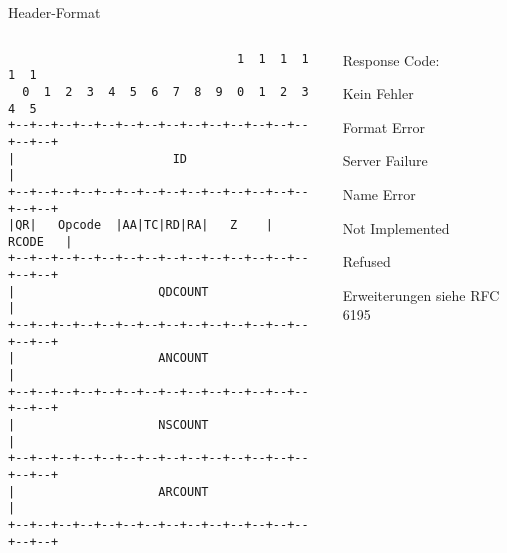 \documentclass{beamer}
\begin{document}
  \begin{frame}[fragile]{\mytitle}{Header-Format}
    \begin{columns}[c]
      \column{5cm}
      \tiny{
        \begin{verbatim}
                                1  1  1  1  1  1
  0  1  2  3  4  5  6  7  8  9  0  1  2  3  4  5
+--+--+--+--+--+--+--+--+--+--+--+--+--+--+--+--+
|                      ID                       |
+--+--+--+--+--+--+--+--+--+--+--+--+--+--+--+--+
|QR|   Opcode  |AA|TC|RD|RA|   Z    |   RCODE   |
+--+--+--+--+--+--+--+--+--+--+--+--+--+--+--+--+
|                    QDCOUNT                    |
+--+--+--+--+--+--+--+--+--+--+--+--+--+--+--+--+
|                    ANCOUNT                    |
+--+--+--+--+--+--+--+--+--+--+--+--+--+--+--+--+
|                    NSCOUNT                    |
+--+--+--+--+--+--+--+--+--+--+--+--+--+--+--+--+
|                    ARCOUNT                    |
+--+--+--+--+--+--+--+--+--+--+--+--+--+--+--+--+
        \end{verbatim}
      }
      \column{7cm}
      \footnotesize{
        \begin{description}
          \item[RC] Response Code:
          \item[0] Kein Fehler
          \item[1] Format Error
          \item[2] Server Failure
          \item[3] Name Error
          \item[4] Not Implemented
          \item[5] Refused
          \item Erweiterungen siehe RFC 6195 \cite{rfc6195}
        \end{description}
      }
    \end{columns}
\end{frame}
\end{document}
